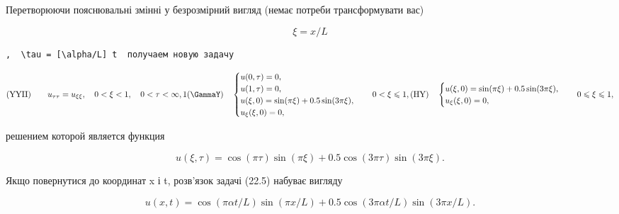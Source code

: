 \documentclass[
  ukrainian,
]{article}
\begin{document}
Перетворюючи пояснювальні змінні у безрозмірний вигляд (немає потреби
трансформувати вас)

\[
\xi = x/L
\]

\begin{verbatim}
,  \tau = [\alpha/L] t  получаем новую задачу
\end{verbatim}

\[
(\text{YYII}) \qquad u_{\tau\tau} = u_{\xi\xi}, \quad 0 < \xi < 1, \quad 0 < \tau < \infty, 1
(\text{\GammaY}) \quad
\begin{cases} u(0, \tau) = 0, \\ u(1, \tau) = 0, \\ u(\xi, 0) = \sin(\pi\xi) + 0.5\sin(3\pi\xi), \\ u_{\xi}(\xi, 0) = 0, \end{cases}
\quad 0 < \xi \leqslant 1,
(\text{HY}) \quad
\begin{cases} u(\xi, 0) = \sin(\pi\xi) + 0.5\sin(3\pi\xi), \\ u_{\xi}(\xi, 0) = 0, \end{cases}
\quad 0 \leqslant \xi \leqslant 1,
\]

решением которой является функция

\[
u(\xi, \tau) = \cos(\pi \tau) \sin(\pi \xi) + 0.5 \cos(3\pi \tau) \sin(3\pi \xi).
\]

Якщо повернутися до координат x і t, розв'язок задачі (22.5) набуває
вигляду

\[
u(x, t) = \cos(\pi \alpha t/L)\sin(\pi x/L) + 0.5\cos(3\pi \alpha t/L)\sin(3\pi x/L).
\]
\end{document}
